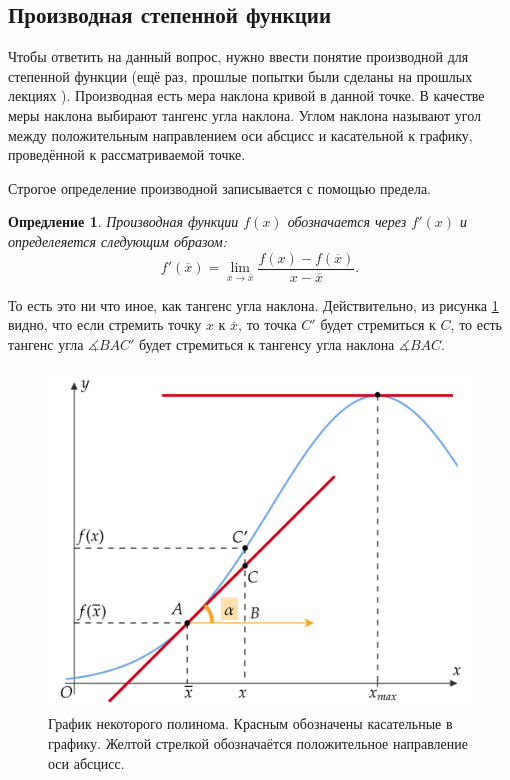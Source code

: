 \documentclass[12pt]{article}
\newtheorem{definition}{Опредление}[section]
\begin{document}
\subsection{Производная степенной функции}
\par Чтобы ответить на данный вопрос, нужно ввести понятие производной для степенной функции (ещё раз, прошлые попытки были сделаны на прошлых лекциях \cite{lim_use}). Производная есть мера наклона кривой в данной точке. В качестве меры наклона выбирают тангенс угла наклона. Углом наклона называют угол между положительным направлением оси абсцисс и касательной к графику, проведённой к рассматриваемой точке.

\par Строгое определение производной записывается с помощью предела. 

\begin{definition}\label{def:1}
Производная функции $f(x)$ обозначается через $f'(x)$ и определеяется следующим образом:
\begin{equation}
	f'(\overline{x}) = \lim_{x\rightarrow\overline{x}}\dfrac{f(x) - f(\overline{x})}{x - \overline{x}}.
	\end{equation}
\end{definition}
То есть это ни что иное, как тангенс угла наклона. Действительно, из рисунка \ref{fig:fig1} видно, что если стремить точку $x$ к $\overline{x}$, то точка $C'$ будет стремиться к $C$, то есть тангенс угла $\measuredangle BAC'$ будет стремиться к тангенсу угла наклона $\measuredangle BAC$.

\begin{figure}[htbp]
	\centering
	\includegraphics[width=1\linewidth]{fig1}
	\caption{График некоторого полинома. Красным обозначены касательные в графику. Желтой стрелкой обозначаётся положительное направление оси абсцисс.}
	\label{fig:fig1}
\end{figure}
\end{document}
